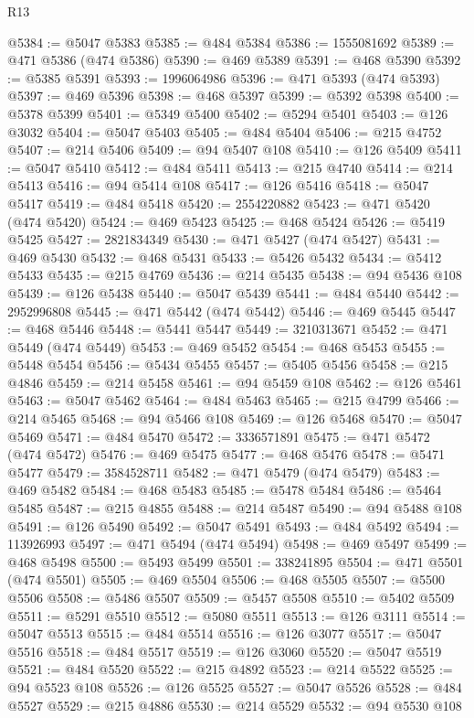 \begin{lexlean}{R13}
\begin{coremodule}
@5384 := @5047 @5383
@5385 := @484 @5384
@5386 := 1555081692
@5389 := @471 @5386 (@474 @5386)
@5390 := @469 @5389
@5391 := @468 @5390
@5392 := @5385 @5391
@5393 := 1996064986
@5396 := @471 @5393 (@474 @5393)
@5397 := @469 @5396
@5398 := @468 @5397
@5399 := @5392 @5398
@5400 := @5378 @5399
@5401 := @5349 @5400
@5402 := @5294 @5401
@5403 := @126 @3032
@5404 := @5047 @5403
@5405 := @484 @5404
@5406 := @215 @4752
@5407 := @214 @5406
@5409 := @94 @5407 @108
@5410 := @126 @5409
@5411 := @5047 @5410
@5412 := @484 @5411
@5413 := @215 @4740
@5414 := @214 @5413
@5416 := @94 @5414 @108
@5417 := @126 @5416
@5418 := @5047 @5417
@5419 := @484 @5418
@5420 := 2554220882
@5423 := @471 @5420 (@474 @5420)
@5424 := @469 @5423
@5425 := @468 @5424
@5426 := @5419 @5425
@5427 := 2821834349
@5430 := @471 @5427 (@474 @5427)
@5431 := @469 @5430
@5432 := @468 @5431
@5433 := @5426 @5432
@5434 := @5412 @5433
@5435 := @215 @4769
@5436 := @214 @5435
@5438 := @94 @5436 @108
@5439 := @126 @5438
@5440 := @5047 @5439
@5441 := @484 @5440
@5442 := 2952996808
@5445 := @471 @5442 (@474 @5442)
@5446 := @469 @5445
@5447 := @468 @5446
@5448 := @5441 @5447
@5449 := 3210313671
@5452 := @471 @5449 (@474 @5449)
@5453 := @469 @5452
@5454 := @468 @5453
@5455 := @5448 @5454
@5456 := @5434 @5455
@5457 := @5405 @5456
@5458 := @215 @4846
@5459 := @214 @5458
@5461 := @94 @5459 @108
@5462 := @126 @5461
@5463 := @5047 @5462
@5464 := @484 @5463
@5465 := @215 @4799
@5466 := @214 @5465
@5468 := @94 @5466 @108
@5469 := @126 @5468
@5470 := @5047 @5469
@5471 := @484 @5470
@5472 := 3336571891
@5475 := @471 @5472 (@474 @5472)
@5476 := @469 @5475
@5477 := @468 @5476
@5478 := @5471 @5477
@5479 := 3584528711
@5482 := @471 @5479 (@474 @5479)
@5483 := @469 @5482
@5484 := @468 @5483
@5485 := @5478 @5484
@5486 := @5464 @5485
@5487 := @215 @4855
@5488 := @214 @5487
@5490 := @94 @5488 @108
@5491 := @126 @5490
@5492 := @5047 @5491
@5493 := @484 @5492
@5494 := 113926993
@5497 := @471 @5494 (@474 @5494)
@5498 := @469 @5497
@5499 := @468 @5498
@5500 := @5493 @5499
@5501 := 338241895
@5504 := @471 @5501 (@474 @5501)
@5505 := @469 @5504
@5506 := @468 @5505
@5507 := @5500 @5506
@5508 := @5486 @5507
@5509 := @5457 @5508
@5510 := @5402 @5509
@5511 := @5291 @5510
@5512 := @5080 @5511
@5513 := @126 @3111
@5514 := @5047 @5513
@5515 := @484 @5514
@5516 := @126 @3077
@5517 := @5047 @5516
@5518 := @484 @5517
@5519 := @126 @3060
@5520 := @5047 @5519
@5521 := @484 @5520
@5522 := @215 @4892
@5523 := @214 @5522
@5525 := @94 @5523 @108
@5526 := @126 @5525
@5527 := @5047 @5526
@5528 := @484 @5527
@5529 := @215 @4886
@5530 := @214 @5529
@5532 := @94 @5530 @108

\end{coremodule}
\end{lexlean}
